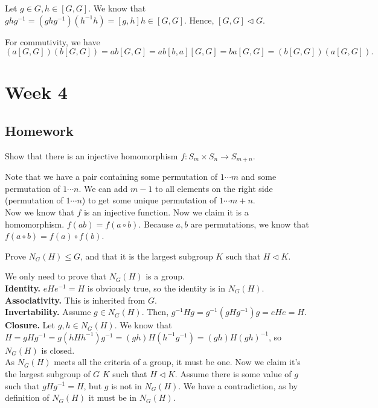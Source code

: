 \documentclass{scrartcl}
\begin{document}
\begin{soln}
Let $g \in G, h \in [G,G].$ We know that $ghg^{-1} = (ghg^{-1})(h^{-1}h) = [g,h]h \in [G,G]$. Hence, $[G,G] \lhd G$. 

For commutivity, we have $$(a[G, G])(b[G, G]) = ab[G,G] = ab[b,a][G,G] = ba[G,G] = (b[G,G])(a[G,G]).$$
\end{soln}

\newpage
\section{Week 4}

\subsection{Homework}

\begin{problem}[1]
    Show that there is an injective homomorphism $f : S_m \times S_n \rightarrow S_{m+n}$.
\end{problem}

\begin{soln}
    Note that we have a pair containing some permutation of $1 \cdots m$ and some permutation of $1 \cdots n$. We can add $m-1$ to all elements on the right side (permutation of $1 \cdots n$) to get some unique permutation of $1 \cdots m+n$. \\
	Now we know that $f$ is an injective function. Now we claim it is a homomorphism. $f(ab) = f(a \circ b)$. Because $a,b$ are permutations, we know that $f(a \circ b) = f(a) \circ f(b)$.
\end{soln}

\begin{problem}[4]
	Prove $N_G(H) \le G$, and that it is the largest subgroup $K$ such that $H \lhd K$.
\end{problem}

\begin{soln}
	We only need to prove that $N_G(H)$ is a group. \\ 
	\textbf{Identity.} $eHe^{-1} = H$ is obviously true, so the identity is in $N_G(H)$. \\
	\textbf{Associativity.} This is inherited from $G$. \\ 
	\textbf{Invertability.} Assume $g \in N_G(H)$. Then, $g^{-1}Hg = g^{-1}(gHg^{-1})g = eHe = H$. \\
	\textbf{Closure.} Let $g, h \in N_G(H)$. We know that $H = gHg^{-1} = g(hHh^{-1})g^{-1} = (gh)H(h^{-1}g^{-1}) = (gh)H(gh)^{-1}$, so $N_G(H)$ is closed. \\
	As $N_G(H)$ meets all the criteria of a group, it must be one. Now we claim it's the largest subgroup of $G$ $K$ such that $H \lhd K$. Assume there is some value of $g$ such that $gHg^{-1} = H$, but $g$ is not in $N_G(H)$. We have a contradiction, as by definition of $N_G(H)$ it must be in $N_G(H)$.
\end{soln}
\end{document}
